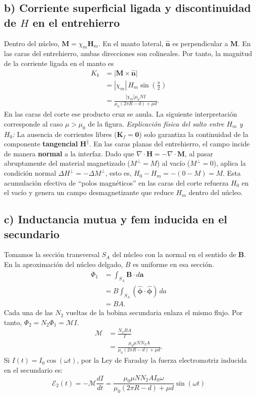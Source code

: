 \documentclass[11pt]{article}
\begin{document}
\subsection*{b) Corriente superficial ligada y discontinuidad de $H$ en el entrehierro}
Dentro del núcleo, $\mathbf M=\chi_m\mathbf H_m$. En el manto
lateral, $\hat{\mathbf n}$ es perpendicular a $\mathbf M$.
En las caras del entrehierro, ambas direcciones son colineales.
Por tanto, la magnitud de la corriente ligada en el manto es
\begin{align*}
    K_b
    &=\bigl|\mathbf M\times\hat{\mathbf n}\bigr|\\
    &=|\chi_m|\,H_m\sin\left(\frac{\pi}{2}\right)\\
    &=\frac{|\chi_m|\mu_0 NI}{\mu_0(2\pi R-d)+\mu d}.
\end{align*}
En las caras del corte ese producto cruz se anula. La siguiente
interpretación corresponde al caso $\mu>\mu_0$ de la figura.
\textit{Explicación física del salto entre $H_m$ y $H_0$:} La ausencia de corrientes libres ($\mathbf{K}_f = \mathbf{0}$) solo garantiza la continuidad de la componente \textbf{tangencial} $\mathbf{H}^\parallel$. En las caras planas del entrehierro, el campo incide de manera \textbf{normal} a la interfaz. Dado que $\nabla \cdot \mathbf{H} = -\nabla \cdot \mathbf{M}$, al pasar abruptamente del material magnetizado ($M^\perp = M$) al vacío ($M^\perp = 0$), aplica la condición normal $\Delta H^\perp = -\Delta M^\perp$, esto es, $H_0 - H_m = -(0 - M) = M$. Esta acumulación efectiva de ``polos magnéticos'' en las caras del corte refuerza $H_0$ en el vacío y genera un campo desmagnetizante que reduce $H_m$ dentro del núcleo.

\subsection*{c) Inductancia mutua y fem inducida en el secundario}
Tomamos la sección transversal $S_A$ del núcleo con la normal en
el sentido de $\mathbf B$. En la aproximación del núcleo delgado,
$B$ es uniforme en esa sección.
\begin{align*}
    \Phi_1
    &=\int_{S_A}\mathbf B\cdot d\mathbf a\\
    &=B\int_{S_A}
       (\hat{\boldsymbol\phi}\cdot\hat{\boldsymbol\phi})\,da\\
    &=BA.
\end{align*}
Cada una de las $N_2$ vueltas de la bobina secundaria enlaza el
mismo flujo. Por tanto, $\Phi_2=N_2\Phi_1=\mathcal M I$.
\begin{align*}
    \mathcal M
    &=\frac{N_2BA}{I}\\
    &=\frac{\mu_0\mu NN_2 A}{\mu_0(2\pi R-d)+\mu d}.
\end{align*}
Si $I(t) = I_0 \cos(\omega t)$, por la Ley de Faraday la fuerza electromotriz inducida en el secundario es:
\begin{equation}
    \mathcal{E}_2(t) = -\mathcal{M} \frac{dI}{dt} = \frac{\mu_0 \mu N N_2 A I_0 \omega}{\mu_0(2\pi R - d) + \mu d} \sin(\omega t)
\end{equation}
\end{document}
